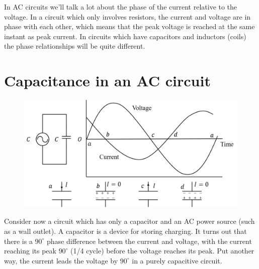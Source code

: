 \documentclass[../main.tex]{subfiles}
\begin{document}
In AC circuits we'll talk a lot about the phase of the current relative to the voltage. In a circuit which only involves resistors, the current and voltage are in phase with each other, which means that the peak voltage is reached at the same instant as peak current. In circuits which have capacitors and inductors (coils) the phase relationships will be quite different.
\section{Capacitance in an AC circuit}
\begin{figure}[ht]
    \centering
    \includegraphics[scale=.75]{ac-circuit-2.png}
\end{figure}
Consider now a circuit which has only a capacitor and an AC power source (such as a wall outlet). A capacitor is a device for storing charging. It turns out that there is a $ 90^\circ $ phase difference between the current and voltage, with the current reaching its peak $ 90^\circ $ (1/4 cycle) before the voltage reaches its peak. Put another way, the current leads the voltage by $ 90^\circ  $ in a purely capacitive circuit.
\end{document}
